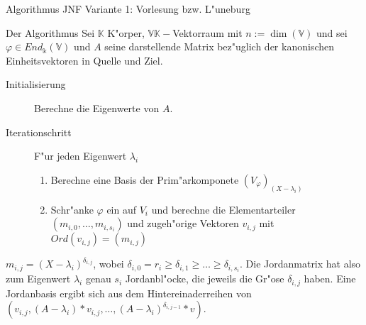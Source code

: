 \documentclass[a4paper]{article}
\begin{document}
\begin{section}{Algorithmus JNF Variante 1: Vorlesung bzw. L"uneburg}
\begin{subsection}{Der Algorithmus}
Sei $\mathbb{K}$ K"orper, $\mathbb{V} \mathbb{K}-$Vektorraum mit $n := \dim(\mathbb{V})$ und sei $\varphi \in End_\mathbb{k}(\mathbb{V})$ und $A$ seine darstellende Matrix bez"uglich der kanonischen Einheitsvektoren in Quelle und Ziel. \\
\begin{description}
\item [Initialisierung] Berechne die Eigenwerte von $A$.
\item [Iterationschritt] F"ur jeden Eigenwert $\lambda_i$
 \begin{enumerate}
  \item Berechne eine Basis der Prim"arkomponete $(V_\varphi)_{(X-\lambda_i)}$
  \item Schr"anke $\varphi$ ein auf $V_i$ und berechne die Elementarteiler $(m_{i,0},\ldots,m_{i,s_i})$ und zugeh"orige Vektoren $v_{i,j}$ mit $Ord(v_{i,j})=(m_{i,j})$
 \end{enumerate}
\end{description}
$m_{i,j}=(X-\lambda_i)^{\delta_{i,j}}$, wobei $\delta_{i,0}=r_i \geq \delta_{i,1} \geq \ldots \geq \delta_{i,s_i}$. Die Jordanmatrix hat also zum Eigenwert $\lambda_i$ genau $s_i$ Jordanbl"ocke, die jeweils die Gr"ose $\delta_{i,j}$ haben. Eine Jordanbasis ergibt sich aus dem Hintereinaderreihen von $(v_{i,j}, (A-\lambda_i)*v_{i,j}, \ldots, (A-\lambda_i)^{\delta_{i,j-1}}*v)$.
\end{subsection}
\end{section}
\end{document}
